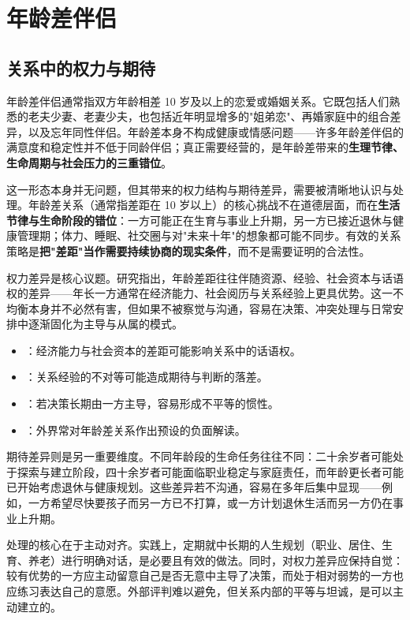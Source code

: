 \section{年龄差伴侣}
\subsection{关系中的权力与期待}

年龄差伴侣通常指双方年龄相差 10 岁及以上的恋爱或婚姻关系。它既包括人们熟悉的老夫少妻、老妻少夫，也包括近年明显增多的"姐弟恋"、再婚家庭中的组合差异，以及忘年同性伴侣。年龄差本身不构成健康或情感问题——许多年龄差伴侣的满意度和稳定性并不低于同龄伴侣；真正需要经营的，是年龄差带来的\textbf{生理节律、生命周期与社会压力的三重错位}。

这一形态本身并无问题，但其带来的权力结构与期待差异，需要被清晰地认识与处理。年龄差关系（通常指差距在 10 岁以上）的核心挑战不在道德层面，而在\textbf{生活节律与生命阶段的错位}：一方可能正在生育与事业上升期，另一方已接近退休与健康管理期；体力、睡眠、社交圈与对"未来十年"的想象都可能不同步。有效的关系策略是\textbf{把"差距"当作需要持续协商的现实条件}，而不是需要证明的合法性。

权力差异是核心议题。研究指出，年龄差距往往伴随资源、经验、社会资本与话语权的差异——年长一方通常在经济能力、社会阅历与关系经验上更具优势。这一不均衡本身并不必然有害，但如果不被察觉与沟通，容易在决策、冲突处理与日常安排中逐渐固化为主导与从属的模式。

\begin{itemize}
  \item {}：经济能力与社会资本的差距可能影响关系中的话语权。
  \item {}：关系经验的不对等可能造成期待与判断的落差。
  \item {}：若决策长期由一方主导，容易形成不平等的惯性。
  \item {}：外界常对年龄差关系作出预设的负面解读。
\end{itemize}

期待差异则是另一重要维度。不同年龄段的生命任务往往不同：二十余岁者可能处于探索与建立阶段，四十余岁者可能面临职业稳定与家庭责任，而年龄更长者可能已开始考虑退休与健康规划。这些差异若不沟通，容易在多年后集中显现——例如，一方希望尽快要孩子而另一方已不打算，或一方计划退休生活而另一方仍在事业上升期。

处理的核心在于主动对齐。实践上，定期就中长期的人生规划（职业、居住、生育、养老）进行明确对话，是必要且有效的做法。同时，对权力差异应保持自觉：较有优势的一方应主动留意自己是否无意中主导了决策，而处于相对弱势的一方也应练习表达自己的意愿。外部评判难以避免，但关系内部的平等与坦诚，是可以主动建立的。

